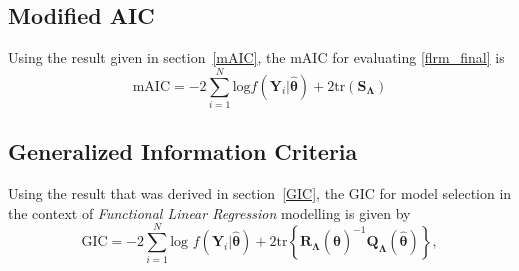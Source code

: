 \subsection{Modified AIC}
Using the result given in section~\ref{mAIC}, the mAIC for evaluating \eqref{flrm_final} is
\begin{equation}\label{flrm_maic}
\text{mAIC} = -2 \sum_{i=1}^{N} \text{log} f(\bm{Y}_i|\hat{\bm{\theta}}) + 2\text{tr}(\bm{S}_{\bm{\Lambda}})
\end{equation}

\subsection{Generalized Information Criteria}\label{gic_d}
Using the result that was derived in section~\ref{GIC}, the GIC for model selection in the context of \textit{Functional Linear Regression} modelling is given by
\begin{equation}\label{flrm_gic}
\text{GIC} = -2 \sum_{i=1}^{N} \text{log } f(\bm{Y}_i|\hat{\bm{\theta}}) + 2 \text{tr} \left\{\bm{R}_{\bm{\Lambda}}(\hat{\bm{\theta}})^{-1} \bm{Q}_{\bm{\Lambda}}(\hat{\bm{\theta}})\right\},
\end{equation}

